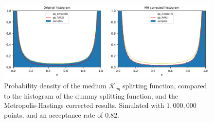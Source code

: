 \documentclass[main.tex]{subfiles}
\begin{document}
\begin{figure}[hbt]
    \centering
    \includegraphics[width=15cm]{pictures/plots/Metropolis-Hastings/MH_medium_gg.png}
    \caption{Probability density of the medium \(\mathcal{K}_{gg}\) splitting function, compared to the histogram of the dummy splitting function, and the Metropolis-Hastings corrected results. Simulated with \(1,000,000\) points, and an acceptance rate of \(0.82\).}
    \label{fig: MH_corrected_k_gg_medium_splitting}
\end{figure}
\end{document}
